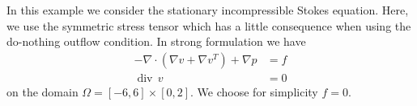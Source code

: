 In this example we consider the stationary incompressible Stokes equation. Here,
we use the symmetric stress tensor which has a little consequence when using 
the do-nothing outflow condition. In strong formulation we have
\begin{align*}
-\nabla\cdot (\nabla v + \nabla v^{T}) + \nabla p &= f \\
\operatorname{div}\, v &= 0 
\end{align*}
on the domain $\Omega = [-6,6]\times [0,2]$. We choose for simplicity $f=0$.
